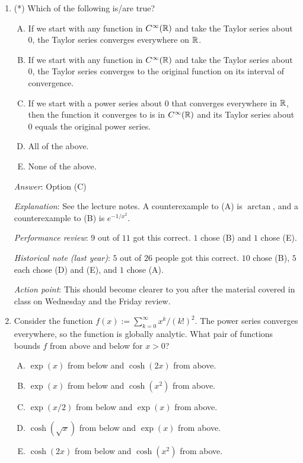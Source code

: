 \documentclass[10pt]{amsart}
\begin{document}
\begin{enumerate}
  {\em Performance review}: $3$ out of $11$ got this correct. $4$
  chose (B) $3$ chose (D), $1$ chose (C).

  {\em Historical note (last year)}: $3$ out of $26$ people got this
  correct. $11$ chose (C), $7$ chose (D), $3$ chose (A), $1$ chose (B).

  {\em Action point}: Please make sure you review and understand this
  solution. The underlying idea is extremely important!
\item (*) Which of the following is/are true?

  \begin{enumerate}[(A)]
  \item If we start with any function in $C^\infty(\mathbb{R})$ and take the
    Taylor series about $0$, the Taylor series converges everywhere on
    $\mathbb{R}$.
  \item If we start with any function in $C^\infty(\mathbb{R})$ and take the
    Taylor series about $0$, the Taylor series converges to the
    original function on its interval of convergence.
  \item If we start with a power series about $0$ that converges
    everywhere in $\mathbb{R}$, then the function it converges to is in
    $C^\infty(\mathbb{R})$ and its Taylor series about $0$ equals the original
    power series.
  \item All of the above.
  \item None of the above.
  \end{enumerate}

  {\em Answer}: Option (C)

  {\em Explanation}: See the lecture notes. A counterexample to (A) is
  $\arctan$, and a counterexample to (B) is $e^{-1/x^2}$.

  {\em Performance review}: $9$ out of $11$ got this correct. $1$
  chose (B) and $1$ chose (E).

  {\em Historical note (last year)}: $5$ out of $26$ people got this
  correct. $10$ chose (B), $5$ each chose (D) and (E), and $1$ chose
  (A).

  {\em Action point}: This should become clearer to you after the
  material covered in class on Wednesday and the Friday review.
\item Consider the function $f(x) := \sum_{k=0}^\infty
  x^k/(k!)^2$. The power series converges everywhere, so the function
  is globally analytic. What pair of functions bounds $f$ from above
  and below for $x > 0$?

  \begin{enumerate}[(A)]
  \item $\exp(x)$ from below and $\cosh(2x)$ from above.
  \item $\exp(x)$ from below and $\cosh(x^2)$ from above.
  \item $\exp(x/2)$ from below and $\exp(x)$ from above.
  \item $\cosh(\sqrt{x})$ from below and $\exp(x)$ from above.
  \item $\cosh(2x)$ from below and $\cosh(x^2)$ from above.
  \end{enumerate}


\end{enumerate}
\end{document}
